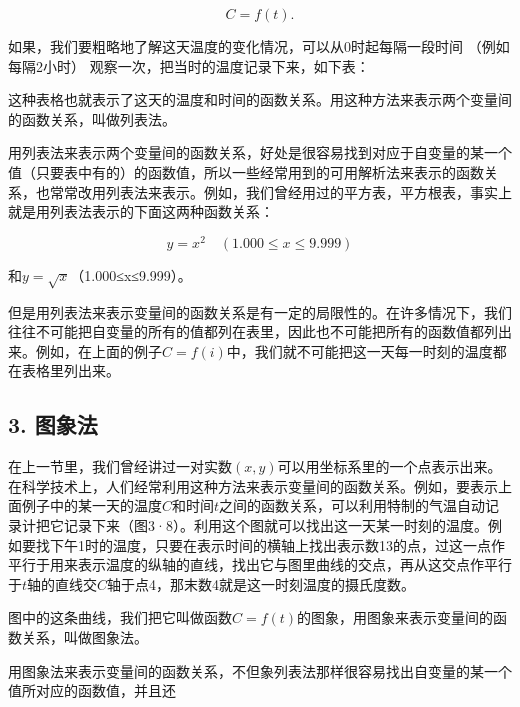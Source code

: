 \[
C = f (t).
\]

如果，我们要粗略地了解这天温度的变化情况，可以从0时起每隔一段时间
（例如每隔2小时） 观察一次，把当时的温度记录下来，如下表：

{\centering
\scriptsize\setlength{\tabcolsep}{2.2pt}%
\par
}

这种表格也就表示了这天的温度和时间的函数关系。用这种方法来表示两个变量间的函数关系，叫做列表法。

用列表法来表示两个变量间的函数关系，好处是很容易找到对应于自变量的某一个值（只要表中有的）的函数值，所以一些经常用到的可用解析法来表示的函数关系，也常常改用列表法来表示。例如，我们曾经用过的平方表，平方根表，事实上就是用列表法表示的下面这两种函数关系：

\[
y = x^{2} \quad (1.000 \leqslant x \leqslant 9.999)
\]

和\(y = \sqrt{x}\)（1.000≤x≤9.999）。

但是用列表法来表示变量间的函数关系是有一定的局限性的。在许多情况下，我们往往不可能把自变量的所有的值都列在表里，因此也不可能把所有的函数值都列出来。例如，在上面的例子\(C = f(i)\)中，我们就不可能把这一天每一时刻的温度都在表格里列出来。

\subsection{3. 图象法}

在上一节里，我们曾经讲过一对实数\((x, y)\)可以用坐标系里的一个点表示出来。在科学技术上，人们经常利用这种方法来表示变量间的函数关系。例如，要表示上面例子中的某一天的温度\(C\)和时间\(t\)之间的函数关系，可以利用特制的气温自动记录计把它记录下来（图3·8）。利用这个图就可以找出这一天某一时刻的温度。例如要找下午1时的温度，只要在表示时间的横轴上找出表示数13的点，过这一点作平行于用来表示温度的纵轴的直线，找出它与图里曲线的交点，再从这交点作平行于\(t\)轴的直线交\(C\)轴于点4，那末数4就是这一时刻温度的摄氏度数。

图中的这条曲线，我们把它叫做函数\(C = f(t)\)的图象，用图象来表示变量间的函数关系，叫做图象法。

用图象法来表示变量间的函数关系，不但象列表法那样很容易找出自变量的某一个值所对应的函数值，并且还

